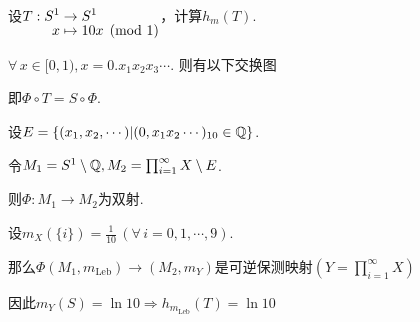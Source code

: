 \begin{instance}
    设$\setjot[-2]\begin{aligned}[t]
        T:S^1&\to S^1 \\
        x&\mapsto 10x\pmod{1}
    \end{aligned}$，计算$h_m(T)$.\par
    $\forall\, x\in [0,1),x=0.x_1x_2x_3\cdots$.
    则有以下交换图 \par
    \hspace{-2.2em}
    \begin{minipage}[t]{0.48\textwidth}
    \end{minipage}
    \begin{minipage}[t]{0.5\textwidth}
        \vspace{-7 em}
        即$\Phi\circ T=S\circ\Phi$.\par
        设$E=\{(x_1,x_2,\cdots)|(0,x_1x_2\cdots)_{10}\in\mathbb{Q}\}$.\par
        令$M_1=S^1\setminus\mathbb{Q},M_2=\prod_{i=1}^{\infty}{X\setminus E}$.\par
        则$\Phi:M_1\to M_2$为双射.\par
        设$m_X(\{i\})=\frac{1}{10}\,(\forall\, i=0,1,\cdots,9)$.\par
        那么$\Phi(M_1,m_\mathrm{Leb})\to(M_2,m_Y)$是可逆保测映射$(Y=\prod_{i=1}^\infty{X})$\par
        因此$m_Y(S)=\ln{10}\Rightarrow h_{m_\mathrm{Leb}}(T)=\ln{10}$
    \end{minipage}\par
\end{instance}




